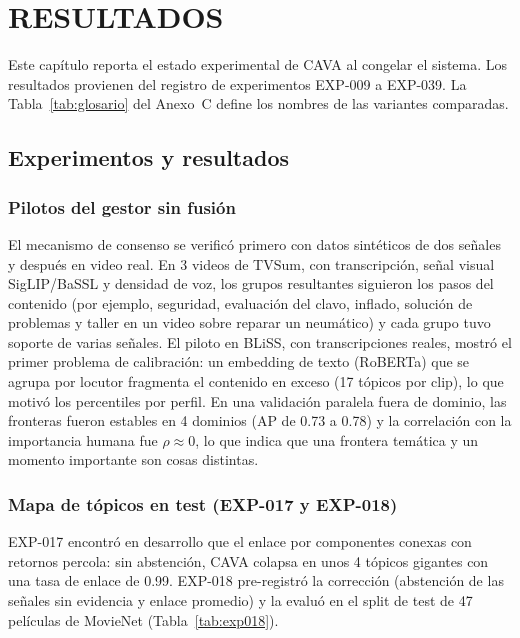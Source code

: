 \chapter{RESULTADOS}

Este capítulo reporta el estado experimental de CAVA al congelar el sistema. Los resultados
provienen del registro de experimentos EXP-009 a EXP-039. La
Tabla~\ref{tab:glosario} del Anexo~C define los nombres de las variantes comparadas.

\section{Experimentos y resultados}

\subsection{Pilotos del gestor sin fusión}

El mecanismo de consenso se verificó primero con datos sintéticos de dos señales y después en
video real. En 3 videos de TVSum, con transcripción, señal visual SigLIP/BaSSL y densidad de
voz, los grupos resultantes siguieron los pasos del contenido (por ejemplo, seguridad,
evaluación del clavo, inflado, solución de problemas y taller en un video sobre reparar un
neumático) y cada grupo tuvo soporte de varias señales. El piloto en BLiSS, con
transcripciones reales, mostró el primer problema de calibración: un embedding de texto
(RoBERTa) que se agrupa por locutor fragmenta el contenido en exceso (17 tópicos por clip), lo
que motivó los percentiles por perfil. En una validación paralela fuera de dominio, las
fronteras fueron estables en 4 dominios (AP de 0.73 a 0.78) y la correlación con la
importancia humana fue $\rho \approx 0$, lo que indica que una frontera temática y un momento
importante son cosas distintas.

\subsection{Mapa de tópicos en test (EXP-017 y EXP-018)}

EXP-017 encontró en desarrollo que el enlace por componentes conexas con retornos percola: sin
abstención, CAVA colapsa en unos 4 tópicos gigantes con una tasa de enlace de 0.99. EXP-018
pre-registró la corrección (abstención de las señales sin evidencia y enlace promedio) y la
evaluó en el split de test de 47 películas de MovieNet (Tabla~\ref{tab:exp018}).

